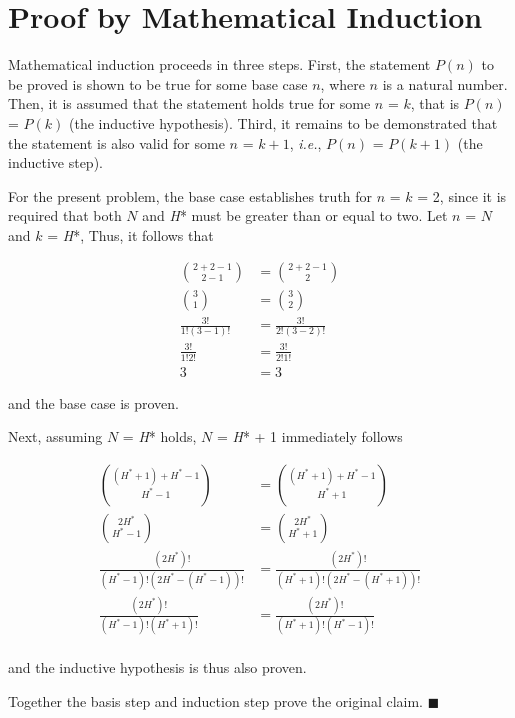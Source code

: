 \section{Proof by Mathematical Induction}

Mathematical induction proceeds in three steps. First, the statement $P(n)$ to be proved is shown to be true for some base case $n$, where $n$ is a natural number. Then, it is assumed that the statement holds true for some $n$ = $k$, that is $P(n)$ = $P(k)$ (the inductive hypothesis). Third, it remains to be demonstrated that the statement is also valid for some $n$ = $k+1$, \textit{i.e.}, $P(n)$ = $P(k+1)$ (the inductive step).

\vspace{5mm}

For the present problem, the base case establishes truth for $n$ = $k$ = 2, since it is required that both $N$ and \textit{H}* must be greater than or equal to two. Let $n$ = $N$ and $k$ = \textit{H}*, Thus, it follows that

\begin{align*}
\binom{2 + 2 - 1}{2 - 1} &= \binom{2 + 2 - 1}{2} \\
\binom{3}{1} &= \binom{3}{2} \\
\frac{3!}{1!(3-1)!} &= \frac{3!}{2!(3-2)!} \\
\frac{3!}{1!2!} &= \frac{3!}{2!1!} \\
3 &= 3
\end{align*}

\noindent and the base case is proven.

\vspace{5mm}

Next, assuming $N$ = \textit{H}* holds,  $N$ = \textit{H}* + 1 immediately follows

\begin{align*}
\binom{(H^* + 1) + H^* - 1}{H^* - 1} &= \binom{(H^* + 1) + H^* - 1}{H^* + 1} \\
\binom{2H^*}{H^* - 1} &= \binom{2H^*}{H^* + 1} \\
\frac{(2H^*)!}{(H^* - 1)!(2H^* - (H^* - 1))!} &= \frac{(2H^*)!}{(H^* + 1)!(2H^* - (H^* + 1))!} \\
\frac{(2H^*)!}{(H^* - 1)!(H^* + 1)!} &= \frac{(2H^*)!}{(H^* + 1)!(H^* - 1)!} \\
\end{align*}

\noindent and the inductive hypothesis is thus also proven.

\vspace{5mm}  

Together the basis step and induction step prove the original claim. $\blacksquare$ 


